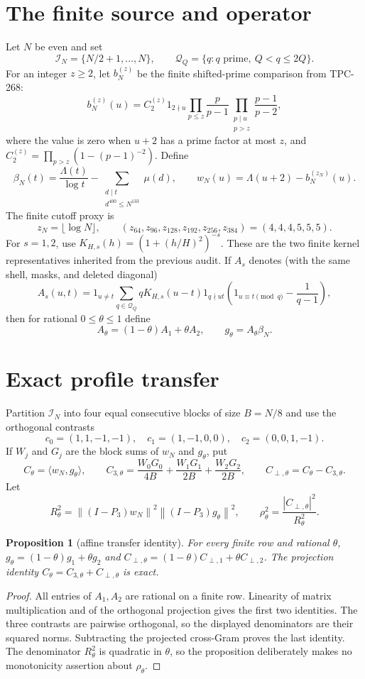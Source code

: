 \documentclass[11pt]{article}
\newtheorem{proposition}{Proposition}
\newcommand{\cI}{\mathcal I}
\newcommand{\norm}[1]{\left\lVert #1\right\rVert}
\begin{document}
\section{The finite source and operator}
Let $N$ be even and set
\[
 \cI_N=\{N/2+1,\ldots,N\},\qquad
 \mathcal Q_Q=\{q:q\text{ prime},\ Q<q\leq2Q\}.
\]
For an integer $z\geq2$, let $b_N^{(z)}$ be the finite shifted-prime
comparison from TPC-268:
\[
 b_N^{(z)}(u)=C_2^{(z)}1_{2\nmid u}
 \prod_{p\leq z}\frac p{p-1}
 \prod_{\substack{p\mid u\\p>z}}\frac{p-1}{p-2},
\]
where the value is zero when $u+2$ has a prime factor at most $z$, and
$C_2^{(z)}=\prod_{p>z}(1-(p-1)^{-2})$. Define
\[
 \beta_N(t)=\frac{\Lambda(t)}{\log t}
 -\sum_{\substack{d\mid t\\d^{400}\leq N^{133}}}\mu(d),
 \qquad w_N(u)=\Lambda(u+2)-b_N^{(z_N)}(u).
\]
The finite cutoff proxy is
\[
 z_N=\lfloor\log N\rfloor,
 \qquad (z_{64},z_{96},z_{128},z_{192},z_{256},z_{384})=(4,4,4,5,5,5).
\]
For $s=1,2$, use $K_{H,s}(h)=(1+(h/H)^2)^{-s}$. These are the two
finite kernel representatives inherited from the previous audit. If $A_s$
denotes (with the same shell, masks, and deleted diagonal)
\[
 A_s(u,t)=1_{u\ne t}\sum_{q\in\mathcal Q_Q}qK_{H,s}(u-t)1_{q\nmid ut}
 \left(1_{u\equiv t\pmod q}-\frac1{q-1}\right),
\]
then for rational $0\leq\theta\leq1$ define
\[
 A_\theta=(1-\theta)A_1+\theta A_2,\qquad
 g_\theta=A_\theta\beta_N.
\]
\section{Exact profile transfer}
Partition $\cI_N$ into four equal consecutive blocks of size $B=N/8$ and
use the orthogonal contrasts
\[
 c_0=(1,1,-1,-1),\quad c_1=(1,-1,0,0),\quad
 c_2=(0,0,1,-1).
\]
If $W_j$ and $G_j$ are the block sums of $w_N$ and $g_\theta$, put
\[
 C_\theta=\langle w_N,g_\theta\rangle,\qquad
 C_{3,\theta}=\frac{W_0G_0}{4B}+\frac{W_1G_1}{2B}+\frac{W_2G_2}{2B},
 \qquad C_{\perp,\theta}=C_\theta-C_{3,\theta}.
\]
Let
\[
 R_\theta^2=\norm{(I-P_3)w_N}^2
                 \norm{(I-P_3)g_\theta}^2,\qquad
 \rho_\theta^2=\frac{|C_{\perp,\theta}|^2}{R_\theta^2}.
\]
\begin{proposition}[affine transfer identity]
For every finite row and rational $\theta$,
$g_\theta=(1-\theta)g_1+\theta g_2$ and
$C_{\perp,\theta}=(1-\theta)C_{\perp,1}+\theta C_{\perp,2}$.
The projection identity $C_\theta=C_{3,\theta}+C_{\perp,\theta}$ is exact.
\end{proposition}
\begin{proof}
All entries of $A_1,A_2$ are rational on a finite row. Linearity of matrix
multiplication and of the orthogonal projection gives the first two identities.
The three contrasts are pairwise orthogonal, so the displayed denominators are
their squared norms. Subtracting the projected cross-Gram proves the last
identity. The denominator $R_\theta^2$ is quadratic in $\theta$, so the
proposition deliberately makes no monotonicity assertion about $\rho_\theta$.
\end{proof}
\end{document}
